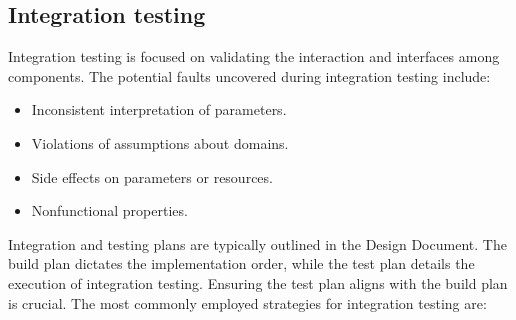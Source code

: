 \subsection{Integration testing}
Integration testing is focused on validating the interaction and interfaces among components.
The potential faults uncovered during integration testing include:
\begin{itemize}
    \item Inconsistent interpretation of parameters.
    \item Violations of assumptions about domains.
    \item Side effects on parameters or resources.
    \item Nonfunctional properties.
\end{itemize}
Integration and testing plans are typically outlined in the Design Document. 
The build plan dictates the implementation order, while the test plan details the execution of integration testing. 
Ensuring the test plan aligns with the build plan is crucial.
The most commonly employed strategies for integration testing are:
